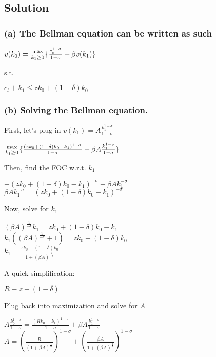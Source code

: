 \documentclass[10pt, a4paper]{article}
\begin{document}
  \subsection*{Solution}
    \subsubsection*{(a) The Bellman equation can be written as such}
    \begin{center}
      $v(k_0)={\max\atop{k_1\geq0}}\{\frac{c_t^{1-\sigma}}{1-\sigma}+\beta v(k_1)\}$ \\
    \end{center}
    s.t.
    \begin{center}
      $c_t + k_1 \leq zk_0+(1-\delta)k_0$ \\
    \end{center}
    \subsubsection*{(b) Solving the Bellman equation.}
    First, let's plug in $v(k_1) = A\frac{k_1^{1-\sigma}}{1-\sigma}$
    \begin{center}
      ${\max\atop{k_1\geq0}}\{\frac{(zk_0+(1-\delta)k_0-k_1)^{1-\sigma}}{1-\sigma}+\beta A\frac{k_1^{1-\sigma}}{1-\sigma}\}$ \\
    \end{center}
    Then, find the FOC w.r.t. $k_1$
    \begin{center}
      $-(zk_0+(1-\delta)k_0-k_1)^{-\sigma}+\beta Ak_1^{-\sigma}$ \\
      $\beta Ak_1^{-\sigma}=(zk_0+(1-\delta)k_0-k_1)^{-\sigma}$ \\ 
    \end{center}
    Now, solve for $k_1$
    \begin{center}
      $(\beta A)^{\frac{1}{-\sigma}}k_1 = zk_0+(1-\delta)k_0-k_1$ \\
      $k_1((\beta A)^{\frac{1}{-\sigma}}+1)=zk_0+(1-\delta)k_0$ \\
      $k_1 = \frac{zk_0+(1-\delta)k_0}{1+(\beta A)^{\frac{1}{-\sigma}}}$ \\
    \end{center}
    A quick simplification:
    \begin{center}
      $R\equiv z+(1-\delta)$ \\
    \end{center}
    Plug back into maximization and solve for $A$
    \begin{center}
      $A\frac{k_0^{1-\sigma}}{1-\sigma}=\frac{(Rk_0-k_1)^{1-\sigma}}{1-\sigma}+\beta A\frac{k_1^{1-\sigma}}{1-\sigma}$ \\
      $A = (\frac{R}{(1+\beta A)^{\frac{1}{\sigma}}})^{1-\sigma}+(\frac{\beta A}{1+(\beta A)^{\frac{1}{\sigma}}})^{1-\sigma}$ \\
    \end{center}
\end{document}
